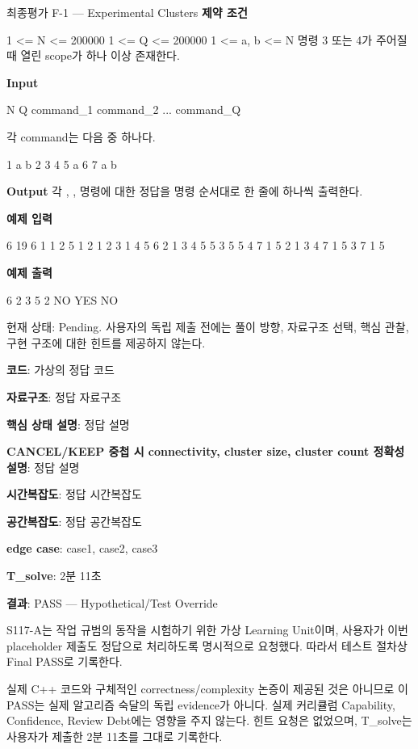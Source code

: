 \begin{problembox}{최종평가 F-1 --- Experimental Clusters}
\textbf{제약 조건}
\begin{TextBlock}
1 <= N <= 200000
1 <= Q <= 200000
1 <= a, b <= N
명령 3 또는 4가 주어질 때 열린 scope가 하나 이상 존재한다.
\end{TextBlock}

\textbf{Input}
\begin{TextBlock}
N Q
command_1
command_2
...
command_Q
\end{TextBlock}

각 command는 다음 중 하나다.
\begin{TextBlock}
1 a b
2
3
4
5 a
6
7 a b
\end{TextBlock}

\textbf{Output}
각 , ,  명령에 대한 정답을 명령 순서대로 한 줄에 하나씩 출력한다.

\textbf{예제 입력}
\begin{TextBlock}
6 19
6
1 1 2
5 1
2
1 2 3
1 4 5
6
2
1 3 4
5 5
3
5 5
4
7 1 5
2
1 3 4
7 1 5
3
7 1 5
\end{TextBlock}

\textbf{예제 출력}
\begin{TextBlock}
6
2
3
5
2
NO
YES
NO
\end{TextBlock}
\end{problembox}

\begin{notebox}[평가 상태]
현재 상태: Pending. 사용자의 독립 제출 전에는 풀이 방향, 자료구조 선택, 핵심 관찰, 구현 구조에 대한 힌트를 제공하지 않는다.
\end{notebox}


\begin{answerbox}
\textbf{코드}: 가상의 정답 코드

\textbf{자료구조}: 정답 자료구조

\textbf{핵심 상태 설명}: 정답 설명

\textbf{CANCEL/KEEP 중첩 시 connectivity, cluster size, cluster count 정확성 설명}: 정답 설명

\textbf{시간복잡도}: 정답 시간복잡도

\textbf{공간복잡도}: 정답 공간복잡도

\textbf{edge case}: case1, case2, case3

\textbf{T\_solve}: 2분 11초
\end{answerbox}

\begin{notebox}[F-1 최종평가 판정]
\textbf{결과}: PASS --- Hypothetical/Test Override

S117-A는 작업 규범의 동작을 시험하기 위한 가상 Learning Unit이며, 사용자가 이번 placeholder 제출도 정답으로 처리하도록 명시적으로 요청했다. 따라서 테스트 절차상 Final PASS로 기록한다.

실제 C++ 코드와 구체적인 correctness/complexity 논증이 제공된 것은 아니므로 이 PASS는 실제 알고리즘 숙달의 독립 evidence가 아니다. 실제 커리큘럼 Capability, Confidence, Review Debt에는 영향을 주지 않는다. 힌트 요청은 없었으며, T\_solve는 사용자가 제출한 2분 11초를 그대로 기록한다.
\end{notebox}


